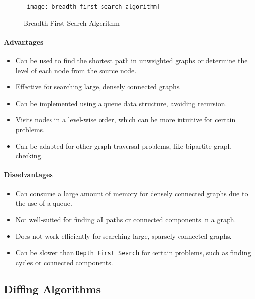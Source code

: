 \begin{figure}[!htbp]
    \centering
    \texttt{[image: breadth-first-search-algorithm]}
    \caption{Breadth First Search Algorithm \cite{zaltsman_dfs_bfs}}
    \label{fig:breadth-first-search-algorithm}
\end{figure}

\paragraph{Advantages}
\begin{itemize}
    \item Can be used to find the shortest path in unweighted graphs or determine the level of each node from the source node.
    \item Effective for searching large, densely connected graphs.
    \item Can be implemented using a queue data structure, avoiding recursion.
    \item Visits nodes in a level-wise order, which can be more intuitive for certain problems.
    \item Can be adapted for other graph traversal problems, like bipartite graph checking.
\end{itemize}
\paragraph{Disadvantages}
\begin{itemize}
    \item Can consume a large amount of memory for densely connected graphs due to the use of a queue.
    \item Not well-suited for finding all paths or connected components in a graph.
    \item Does not work efficiently for searching large, sparsely connected graphs.
    \item Can be slower than \lstinline{Depth First Search} for certain problems, such as finding cycles or connected components.
\end{itemize}


\subsection{Diffing Algorithms}

